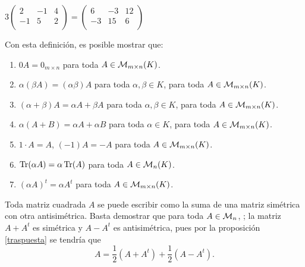 
\begin{ejem}
    $3\begin{pmatrix}
    2 & -1 & 4\\
    -1 & 5 & 2\\
    \end{pmatrix}=\begin{pmatrix}
    6 & -3 & 12\\
    -3 & 15 & 6\\
    \end{pmatrix}$
\end{ejem}

Con esta definici\'on, es posible mostrar que: 

\begin{enumerate}
    \item $0A=0_{m\times n}$ para toda $A\in \mathcal{M}_{m\times n}(K)$.
    \item $\alpha(\beta A)=(\alpha \beta)A$ para toda $\alpha, \beta\in K$, para toda $A\in \mathcal{M}_{m\times n}(K)$.   
    \item $(\alpha+\beta )A=\alpha A +\beta A$ para toda $\alpha, \beta\in K$, para toda $A\in \mathcal{M}_{m\times n}(K)$.
    \item $\alpha(A + B) = \alpha A + \alpha B$ para toda $\alpha \in K$, para toda $A\in \mathcal{M}_{m\times n}(K)$.
    \item $1\cdot A=A$, $(-1)A=-A$ para toda $A\in \mathcal{M}_{m\times n}(K)$.
    \item $\operatorname{Tr}(\alpha A)=\alpha \operatorname{Tr}(A)$ para toda $A\in \mathcal{M}_{ n}(K)$.
    \item $(\alpha A)^t=\alpha A^t$ para toda $A\in \mathcal{M}_{m\times n}(K)$.
\end{enumerate}

\begin{rmk}
Toda matriz cuadrada $A$ se puede escribir como la suma de una matriz simétrica con otra
antisimétrica. Basta demostrar que para toda $A\in  \mathcal{M}_n $, ; la matriz $ A + A^t$ es simétrica y $A -A^t$
es antisimétrica, pues por la proposici\'on \ref{traspuesta} se tendría que
\[A = \frac{1}{2}(A + A^t)+\frac{1}{2}(A - A^t).\]
\end{rmk}


